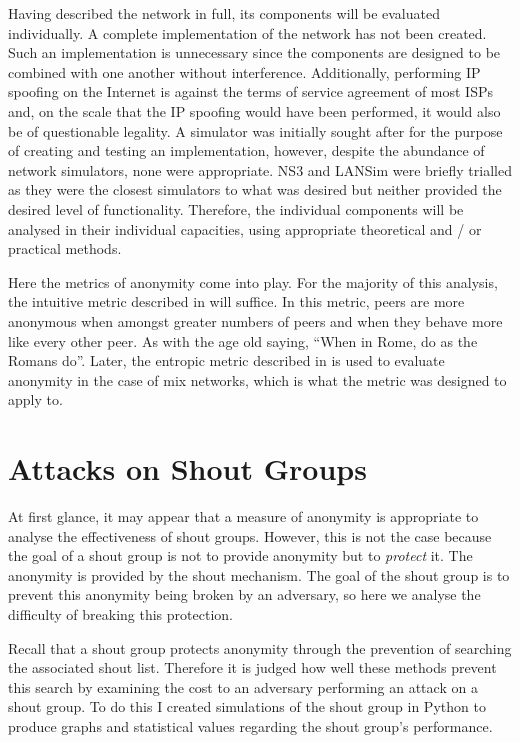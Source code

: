 \documentclass[ %
                    author={Luke Murray},
                supervisor={Dr. Simon Hollis},
                     title={Shadow Peer-to-Peer Networks},
                  subtitle={},
                    degree={MEng},
                      year={2013} ]{thesis}
\begin{document}
Having described the network in full, its components will be evaluated individually. A complete implementation of the network has not been created. Such an implementation is unnecessary since the components are designed to be combined with one another without interference. Additionally, performing IP spoofing on the Internet is against the terms of service agreement of most ISPs and, on the scale that the IP spoofing would have been performed, it would also be of questionable legality. A simulator was initially sought after for the purpose of creating and testing an implementation, however, despite the abundance of network simulators, none were appropriate. NS3\cite{ns3} and LANSim\cite{lansim} were briefly trialled as they were the closest simulators to what was desired but neither provided the desired level of functionality. Therefore, the individual components will be analysed in their individual capacities, using appropriate theoretical and / or practical methods.

Here the metrics of anonymity come into play. For the majority of this analysis, the intuitive metric described in \cite{pfitzmann2001anonymity} will suffice. In this metric, peers are more anonymous when amongst greater numbers of peers and when they behave more like every other peer. As with the age old saying, ``When in Rome, do as the Romans do''. Later, the entropic metric described in \cite{serjantov2003towards} is used to evaluate anonymity in the case of mix networks, which is what the metric was designed to apply to.

\section{Attacks on Shout Groups}

At first glance, it may appear that a measure of anonymity is appropriate to analyse the effectiveness of shout groups. However, this is not the case because the goal of a shout group is not to provide anonymity but to {\em protect} it. The anonymity is provided by the shout mechanism. The goal of the shout group is to prevent this anonymity being broken by an adversary, so here we analyse the difficulty of breaking this protection.

Recall that a shout group protects anonymity through the prevention of searching the associated shout list. Therefore it is judged how well these methods prevent this search by examining the cost to an adversary performing an attack on a shout group. To do this I created simulations of the shout group in Python to produce graphs and statistical values regarding the shout group's performance.
\end{document}
